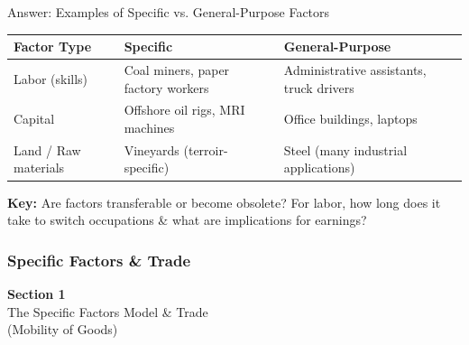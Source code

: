 \documentclass{beamer}
\begin{document}
\begin{frame}{Answer: Examples of Specific vs. General-Purpose Factors}

\begin{center}
\begin{tabular}{l|p{3cm}|p{3cm}}
\toprule
\textbf{Factor Type} & \textbf{Specific} & \textbf{General-Purpose} \\
\midrule
Labor (skills) & Coal miners, paper factory workers & Administrative assistants, truck drivers \\
\midrule
Capital & Offshore oil rigs, MRI machines & Office buildings, laptops \\
\midrule
Land / Raw materials & Vineyards (terroir-specific) & Steel (many industrial applications) \\
\bottomrule
\end{tabular}
\end{center}

\vspace{0.5cm}

\textbf{Key:} Are factors transferable or become obsolete? For labor, how long does it take to switch occupations \& what are implications for earnings?

\end{frame}


\subsubsection{Specific Factors \& Trade}
\begin{frame}

\vspace{2cm}

\centering
{\LARGE \textbf{Section 1}} \\[0.5cm]
{\Large The Specific Factors Model \& Trade} \\[0.3cm]
{\large (Mobility of Goods)}

\vfill

\end{frame}
\end{document}
